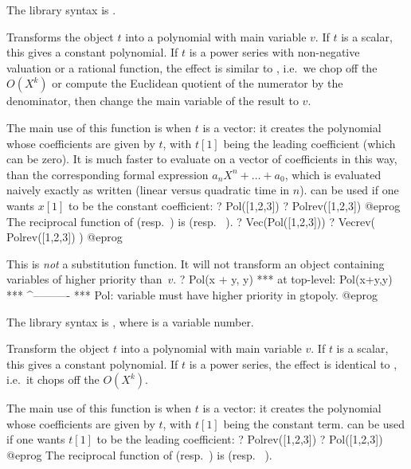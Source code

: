 The library syntax is .

\label{se:Pol}
Transforms the object $t$ into a polynomial with main variable $v$. If $t$
is a scalar, this gives a constant polynomial. If $t$ is a power series with
non-negative valuation or a rational function, the effect is similar to
, i.e.~we chop off the $O(X^k)$ or compute the Euclidean
quotient of the numerator by the denominator, then change the main variable
of the result to $v$.

The main use of this function is when $t$ is a vector: it creates the
polynomial whose coefficients are given by $t$, with $t[1]$ being the leading
coefficient (which can be zero). It is much faster to evaluate
 on a vector of coefficients in this way, than the corresponding
formal expression $a_n X^n + \dots + a_0$, which is evaluated naively exactly
as written (linear versus quadratic time in $n$).  can be used if
one wants $x[1]$ to be the constant coefficient:
\bprog
? Pol([1,2,3])
? Polrev([1,2,3])
@eprog\noindent
The reciprocal function of  (resp.~) is  (resp.~
).
\bprog
? Vec(Pol([1,2,3]))
? Vecrev( Polrev([1,2,3]) )
@eprog\noindent

 This is \emph{not} a substitution function. It will not
transform an object containing variables of higher priority than~$v$.
\bprog
? Pol(x + y, y)
  ***   at top-level: Pol(x+y,y)
  ***                 ^----------
  *** Pol: variable must have higher priority in gtopoly.
@eprog

The library syntax is , where  is a variable number.

\label{se:Polrev}
Transform the object $t$ into a polynomial
with main variable $v$. If $t$ is a scalar, this gives a constant polynomial.
If $t$ is a power series, the effect is identical to , i.e.~it
chops off the $O(X^k)$.

The main use of this function is when $t$ is a vector: it creates the
polynomial whose coefficients are given by $t$, with $t[1]$ being the
constant term.  can be used if one wants $t[1]$ to be the leading
coefficient:
\bprog
? Polrev([1,2,3])
? Pol([1,2,3])
@eprog
The reciprocal function of  (resp.~) is  (resp.~
).

